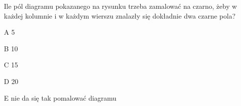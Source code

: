 \begin{tresc}
Ile pól diagramu pokazanego na rysunku trzeba zamalować na czarno, żeby w każdej kolumnie i w każdym wierszu znalazły się dokładnie dwa czarne pola?
\end{tresc}
\begin{wariant}{A} 5 \end{wariant}
\begin{wariant}{B} 10 \end{wariant}
\begin{wariant}{C} 15 \end{wariant}
\begin{wariant}{D} 20 \end{wariant}
\begin{wariant}{E} nie da się tak pomalować diagramu \end{wariant}
